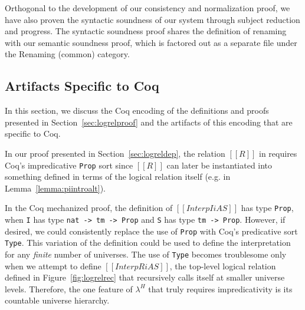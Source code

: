 \documentclass[acmsmall,screen=true,
\ifpublic review=false\else,review=true\fi
  ,anonymous=\ifanonymous true\else false\fi]{acmart}
\newcommand{\lang}{$\lambda^H$\xspace}
\newcommand{\scw}[1]{}
\newcommand{\yl}[1]{}
\begin{document}
Orthogonal to the development of our consistency and normalization
proof, we have also proven the syntactic soundness of our system through subject
reduction and progress. The syntactic soundness proof shares the
definition of renaming with our semantic soundness proof, which is
factored out as a separate file under the Renaming (common) category.
\scw{Should add this line count as another column, for comparison. I've done so,
but may need to update the numbers. }

\subsection{Artifacts Specific to Coq}
In this section, we discuss the Coq encoding of the definitions and proofs presented
in Section~\ref{sec:logrelproof} and the artifacts of this encoding that are
specific to Coq.


In our proof presented in Section~\ref{sec:logreldep}, the relation
$[[R]]$ in  requires Coq's impredicative \texttt{Prop} sort
since $[[R]]$ can later be instantiated into something defined in
terms of the logical relation itself (e.g. in
Lemma~\ref{lemma:piintroalt}). \scw{I'm having trouble connecting the rule in
the figure with rule \texttt{InterpExtFun} in the coq development. Would it make
sense to include the definition of ProdSpace? What is the Coq type of R?}
\yl{I think I might just inline the definition of ProdSpace and then
  rename the variables from the Coq code to match the ones from the paper}

In the Coq mechanized proof, the definition of $[[Interp I i A S]]$ has type
\texttt{Prop}, when \texttt{I} has type \texttt{nat -> tm -> Prop} and \texttt{S}
has type \texttt {tm -> Prop}.  However, if desired, we could consistently
replace the use of \texttt{Prop} with Coq's predicative sort
\texttt{Type}. This variation of the definition could be used to define the
interpretation for any \emph{finite} number of universes. The use of
\texttt{Type} becomes troublesome only when we attempt to define
$[[InterpR i A S]]$, the top-level logical relation defined in
Figure~\ref{fig:logrelrec} that recursively calls itself at smaller universe
levels. Therefore, the one feature of \lang{} that truly requires impredicativity
is its countable universe hierarchy. \scw{I'm not sure the last part of this sentence
adds much: ``Although, lemmas such as the
admissibility of \rref{I-PiAlt} (Lemma~\ref{lemma:piintroalt}) not only simply
our mechanization, but also give better intuition on what our logical relation
means.'' Yes, we need impredicativity to define these lemmas, but without impredicativity
our logical relation means something else.}
\end{document}
